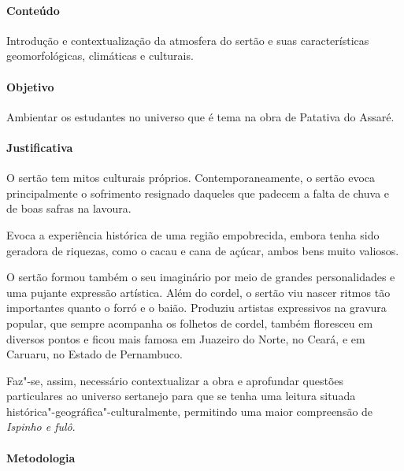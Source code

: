 \documentclass[12pt]{extarticle}
\begin{document}
\paragraph{Conteúdo} Introdução e contextualização da atmosfera do sertão 
e suas características geomorfológicas, climáticas e culturais. 

\paragraph{Objetivo} Ambientar os estudantes no universo que é tema na obra de
Patativa do Assaré.

\paragraph{Justificativa} O sertão tem mitos culturais próprios. 
Contemporaneamente, o sertão evoca principalmente o sofrimento resignado
daqueles que padecem a falta de chuva e de boas safras
na lavoura. 

Evoca a experiência histórica de uma região
empobrecida, embora tenha sido geradora de riquezas, como
o cacau e cana de açúcar, ambos bens muito valiosos.

O sertão formou também o seu imaginário por meio de
grandes personalidades e uma pujante expressão artística.
Além do cordel, o sertão viu nascer ritmos tão importantes
quanto o forró e o baião. Produziu artistas expressivos na 
gravura popular, que sempre acompanha os folhetos de cordel,
também floresceu em diversos pontos e ficou mais famosa
em Juazeiro do Norte, no Ceará, e em Caruaru, no Estado
de Pernambuco.

Faz"-se, assim, necessário contextualizar a obra e aprofundar questões particulares ao universo 
sertanejo para que se tenha uma leitura situada histórica"-geográfica"-culturalmente, 
permitindo uma maior compreensão de \textit{Ispinho e fulô}. 

\paragraph{Metodologia}
\end{document}
